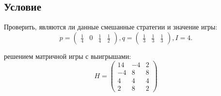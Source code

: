 \documentclass[a4paper,14pt]{extreport}
\begin{document}
\subsection{Условие}
Проверить, являются ли данные смешанные стратегии и значение игры:
\begin{equation*}
    p = \begin{pmatrix}\frac{1}{4} & 0 & \frac{1}{4} & \frac{1}{2} \end{pmatrix}, 
    q = \begin{pmatrix}\frac{1}{3} & \frac{1}{3} & \frac{1}{3} \end{pmatrix},
    I = 4.
\end{equation*} \par
решением матричной игры с выигрышами:
\begin{equation*}
    H = \begin{pmatrix} 
            14 & -4 & 2 \\
            -4 & 8 & 8 \\
            4 & 4 & 4 \\
            2& 8 & 2
        \end{pmatrix}
\end{equation*}
\end{document}
